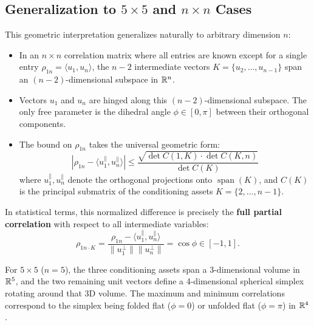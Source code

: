 \documentclass[a4paper]{article}
\begin{document}
\subsection{Generalization to \texorpdfstring{$5 \times 5$}{5x5} and \texorpdfstring{$n \times n$}{nxn} Cases}
This geometric interpretation generalizes naturally to arbitrary dimension $n$:
\begin{itemize}[leftmargin=*]
\item In an $n \times n$ correlation matrix where all entries are known except for a single entry $\rho_{1n} = \langle u_1, u_n \rangle$, the $n-2$ intermediate vectors $K = \{u_2, \dots, u_{n-1}\}$ span an $(n-2)$-dimensional subspace in $\mathbb{R}^n$.
\item Vectors $u_1$ and $u_n$ are hinged along this $(n-2)$-dimensional subspace. The only free parameter is the dihedral angle $\phi \in [0, \pi]$ between their orthogonal components.
\item The bound on $\rho_{1n}$ takes the universal geometric form:
\begin{equation}
\boxed{
\left| \rho_{1n} - \langle u_1^{\parallel}, u_n^{\parallel} \rangle \right| \leq \frac{\sqrt{\det C(1, K) \cdot \det C(K, n)}}{\det C(K)}
}
\end{equation}
where $u_1^{\parallel}, u_n^{\parallel}$ denote the orthogonal projections onto $\operatorname{span}(K)$, and $C(K)$ is the principal submatrix of the conditioning assets $K = \{2, \dots, n-1\}$.
\end{itemize}
In statistical terms, this normalized difference is precisely the \textbf{full partial correlation} with respect to all intermediate variables:
\begin{equation}
\rho_{1n \cdot K} = \frac{\rho_{1n} - \langle u_1^{\parallel}, u_n^{\parallel} \rangle}{\|u_1^{\perp}\| \|u_n^{\perp}\|} = \cos \phi \in [-1, 1].
\end{equation}

For $5 \times 5$ ($n=5$), the three conditioning assets span a 3-dimensional volume in $\mathbb{R}^5$, and the two remaining unit vectors define a 4-dimensional spherical simplex rotating around that 3D volume. The maximum and minimum correlations correspond to the simplex being folded flat ($\phi = 0$) or unfolded flat ($\phi = \pi$) in $\mathbb{R}^4$.
\end{document}
